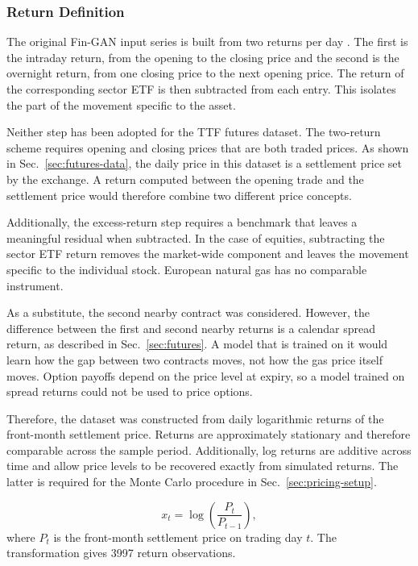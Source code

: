 \subsubsection{Return Definition}\label{sec:return-definition}
The original Fin-GAN input series is built from two returns per day \parencite{vuleticFinGANForecastingClassifying2024}. The first is the intraday return, from the opening to the closing price and the second is the overnight return, from one closing price to the next opening
price. The return of the corresponding sector ETF is then subtracted from each entry. This isolates the part of the movement specific to the asset.

Neither step has been adopted for the TTF futures dataset. The two-return scheme requires opening and closing prices that are both traded prices. As shown in Sec.~\ref{sec:futures-data}, the daily price in this dataset is a settlement price set by the exchange. A return computed between the opening trade and the settlement price would therefore combine two different price concepts.

Additionally, the excess-return step requires a benchmark that leaves a meaningful residual when subtracted. In the case of equities, subtracting the sector ETF return removes the market-wide component and leaves the movement specific to the individual stock. European natural gas has no comparable instrument.

As a substitute, the second nearby contract was considered. However, the difference between the first and second nearby returns is a calendar spread return, as described in Sec.~\ref{sec:futures}. A model that is trained on it would learn how the gap between two contracts moves, not how the gas price itself moves. Option payoffs depend on the price level at expiry, so a model trained on spread returns could not be used to price options.

Therefore, the dataset was constructed from daily logarithmic returns of the front-month settlement price. Returns are approximately stationary and therefore comparable across the sample period. Additionally, log returns are additive across time and allow price levels to be recovered exactly from simulated returns. The latter is required for the Monte Carlo procedure
in Sec.~\ref{sec:pricing-setup}.

\begin{equation}\label{eq:logreturn}
    x_t = \log\!\left(\frac{P_t}{P_{t-1}}\right),
\end{equation}
where $P_t$ is the front-month settlement price on trading day $t$.
The transformation gives \num{3997} return observations.

